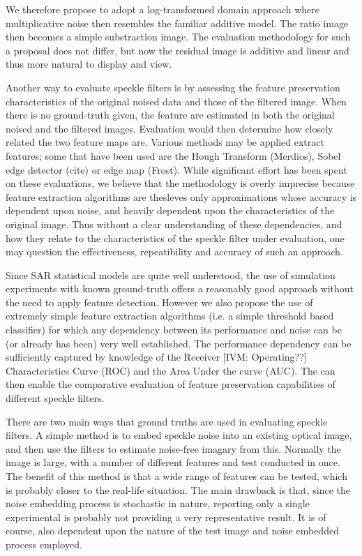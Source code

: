 \documentclass[journal]{IEEEtran}
\begin{document}
We therefore propose to adopt a log-transformed domain approach where multiplicative noise then resembles the familiar additive model.
The ratio image then becomes a simple substraction image.
The evaluation methodology for such a proposal does not differ, but now the residual image is additive and linear and thus more natural to display and view.

Another way to evaluate speckle filters is by assessing the feature preservation characteristics of the original noised data and those of the filtered image. 
When there is no ground-truth given, the feature are estimated in both the original noised and the filtered images.
Evaluation would then determine how closely related the two feature maps are. 
Various methods may be applied extract features; some that have been used are the Hough Transform (Merdios), Sobel edge detector (cite) or edge map (Frost).
While significant effort has been spent on these evaluations, we believe that the methodology is overly imprecise because feature extraction algorithms are thesleves only approximations whose accuracy is dependent upon noise, and heavily dependent upon the characteristics of the original image.
Thus without a clear understanding of these dependencies, and how they relate to the characteristics of the speckle filter under evaluation, one may question the effectiveness, repeatibility and accuracy of such an approach. 

Since SAR statistical models are quite well understood, the use of simulation experiments with known ground-truth offers a reasonably good approach without the need to apply feature detection. However we also propose the use of extremely simple feature extraction algorithms (i.e. a simple threshold based classifier) for which any dependency between its performance and noise can be (or already has been) very well established. The performance dependency can be sufficiently captured by knowledge of the Receiver [IVM: Operating??] Characteristics Curve (ROC) and the Area Under the curve (AUC). The can then enable the comparative evaluation of feature preservation capabilities of different speckle filters.

There are two main ways that ground truths are used in evaluating speckle filters.
A simple method is to embed speckle noise into an existing optical image, and then use the filters to estimate noise-free imagary from this. Normally the image is large, with a number of different features and test conducted in once. The benefit of this method is that a wide range of features can be tested, which is probably closer to the real-life situation. The main drawback is that, since the noise embedding process is stochastic in nature, reporting only a single experimental is probably not providing a very representative result. It is of course, also dependent upon the nature of the test image and noise embedded process employed.
\end{document}
